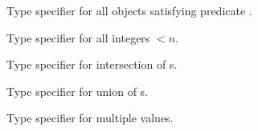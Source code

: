 \begin{LIST}{1cm}
  Type specifier for all objects satisfying predicate . 

  Type specifier for all integers $<n$.

  Type specifier for intersection of s.

  Type specifier for union of s.

  Type specifier for multiple values.

  \end{LIST}


